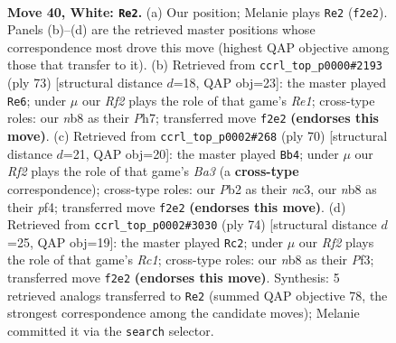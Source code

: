 \documentclass[11pt]{article}
\begin{document}
\clearpage

\begin{figure}[p]\centering
\begin{subfigure}{0.46\textwidth}\centering
\resizebox{\linewidth}{!}{%
\newchessgame
\chessboard[
  setfen={1n4kr/8/1p1p4/1P1P4/p1p3P1/7P/1P3R2/2K5 w - - 9 40},
  showmover=false,
  pgfstyle=straightmove, color=movearrow, markmove={f2-e2}
]}
\caption{}
\end{subfigure}\hfill
\begin{subfigure}{0.46\textwidth}\centering
\resizebox{\linewidth}{!}{%
\newchessgame
\chessboard[
  setfen={4r2k/7p/1p3pp1/p7/P1P5/6PP/5P2/1R4K1 b - - 1 37},
  showmover=false,
  pgfstyle=straightmove, color=movearrow, markmove={e8-e6}
]}
\caption{}
\end{subfigure}
\\[4pt]
\begin{subfigure}{0.46\textwidth}\centering
\resizebox{\linewidth}{!}{%
\newchessgame
\chessboard[
  setfen={3r2k1/1R4p1/p6p/8/5p2/BPn2P2/6PP/5K2 w - - 0 36},
  showmover=false,
  pgfstyle=straightmove, color=movearrow, markmove={a3-b4}
]}
\caption{}
\end{subfigure}\hfill
\begin{subfigure}{0.46\textwidth}\centering
\resizebox{\linewidth}{!}{%
\newchessgame
\chessboard[
  setfen={r2k4/5pp1/2P1p2p/8/1p6/4KP1P/P5P1/2R5 w - - 6 38},
  showmover=false,
  pgfstyle=straightmove, color=movearrow, markmove={c1-c2}
]}
\caption{}
\end{subfigure}
\caption{\textbf{Move 40, White: \texttt{Re2}.} (a) Our position; Melanie plays \texttt{Re2} (\texttt{f2e2}). Panels (b)--(d) are the retrieved master positions whose correspondence most drove this move (highest QAP objective among those that transfer to it). (b) Retrieved from \texttt{ccrl\_top\_p0000\#2193} (ply 73) [structural distance $d$=18, QAP obj=23]: the master played \texttt{Re6}; under $\mu$ our \emph{Rf2} plays the role of that game's \emph{Re1}; cross-type roles: our \emph{n}b8 as their \emph{P}h7; transferred move \texttt{f2e2} \textbf{(endorses this move)}. (c) Retrieved from \texttt{ccrl\_top\_p0002\#268} (ply 70) [structural distance $d$=21, QAP obj=20]: the master played \texttt{Bb4}; under $\mu$ our \emph{Rf2} plays the role of that game's \emph{Ba3} (a \textbf{cross-type} correspondence); cross-type roles: our \emph{P}b2 as their \emph{n}c3, our \emph{n}b8 as their \emph{p}f4; transferred move \texttt{f2e2} \textbf{(endorses this move)}. (d) Retrieved from \texttt{ccrl\_top\_p0002\#3030} (ply 74) [structural distance $d$=25, QAP obj=19]: the master played \texttt{Rc2}; under $\mu$ our \emph{Rf2} plays the role of that game's \emph{Rc1}; cross-type roles: our \emph{n}b8 as their \emph{P}f3; transferred move \texttt{f2e2} \textbf{(endorses this move)}. Synthesis: 5 retrieved analogs transferred to \texttt{Re2} (summed QAP objective 78, the strongest correspondence among the candidate moves); Melanie committed it via the \texttt{search} selector.}
\label{fig:thought-m78}
\end{figure}
\end{document}
